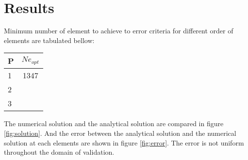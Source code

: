 \documentclass[paper=a4, fontsize=11pt]{article} %
\begin{document}
\section{Results}

Minimum number of element to achieve to error criteria for different order of elements are tabulated bellow: 

\begin{center}
  \begin{tabular}{ l | c}
    \hline
    P & $Ne_{opt}$\\ \hline
    1 & 1347\\ \hline
    2 &  \\ \hline
    3 & \\ \hline
    \hline
  \end{tabular}
\end{center}
The numerical solution and the analytical solution are compared in figure \ref{fig:solution}. And the error between the analytical solution and the numerical solution at each elements are shown in figure \ref{fig:error}. The error is not uniform throughout the domain of validation. 

\end{document}
